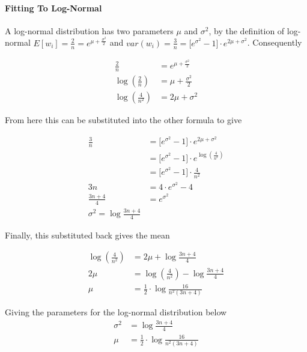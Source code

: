 \paragraph{Fitting To Log-Normal}

A log-normal distribution has two parameters $\mu$ and $\sigma^2$, by the definition of log-normal $E[w_i] = \frac{2}{n} = e^{\mu + \frac{\sigma^2}{2}}$ and $var(w_i) = \frac{3}{n} = \big[e^{\sigma^2} - 1\big] \cdot e^{2\mu + \sigma^2}$. Consequently

\begin{align*}
\frac{2}{n} &= e^{\mu + \frac{\sigma^2}{2}}\\
\log(\frac{2}{n}) &= \mu + \frac{\sigma^2}{2}\\
\log(\frac{4}{n^2}) &= 2\mu + \sigma^2
\end{align*}

From here this can be substituted into the other formula to give

\begin{align*}
\frac{3}{n} &= \big[e^{\sigma^2} - 1\big] \cdot e^{2\mu + \sigma^2}\\
&= \big[e^{\sigma^2} - 1\big] \cdot e^{\log(\frac{4}{n^2})}\\
&= \big[e^{\sigma^2} - 1\big] \cdot \frac{4}{n^2}\\
3n &= 4 \cdot e^{\sigma^2} - 4\\
\frac{3n + 4}{4} &= e^{\sigma^2}\\
\sigma^2 = \log \frac{3n + 4}{4}
\end{align*}

Finally, this substituted back gives the mean

\begin{align*}
\log(\frac{4}{n^2}) &= 2\mu + \log \frac{3n + 4}{4}\\
2\mu &= \log(\frac{4}{n^2}) - \log \frac{3n + 4}{4}\\
\mu &= \frac{1}{2} \cdot \log \frac{16}{n^2(3n + 4)}
\end{align*}

Giving the parameters for the log-normal distribution below
\begin{align}
\sigma^2 &= \log \frac{3n + 4}{4}\\
\mu &= \frac{1}{2} \cdot \log \frac{16}{n^2(3n + 4)}
\end{align}


